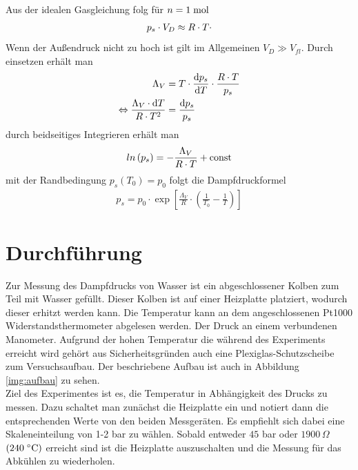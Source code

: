 \documentclass[12pt, a4paper, twoside]{scrartcl}
\begin{document}
Aus der idealen Gasgleichung folg für $n = 1\mathrel{\textnormal{mol}}$
\begin{align}
 p_s\cdot V_D \approx R\cdot T\cdot\nonumber
\end{align}
Wenn der Außendruck nicht zu hoch ist gilt im Allgemeinen $V_D \gg V_{fl}$. Durch einsetzen erhält man 
\begin{align}
 \Lambda_V &= T\cdot \frac{\textnormal{d}p_s}{\textnormal{d}T}\cdot \frac{R\cdot T}{p_s} \nonumber\\
 \mathrel{\Leftrightarrow} \frac{\Lambda_V \cdot \textnormal{d}T}{R\cdot T^2}&= \frac{\textnormal{d}p_s}{p_s} \nonumber
\end{align}
durch beidseitiges Integrieren erhält man
\begin{align}
  ln\left(p_s\right) = -\frac{\Lambda_V}{R\cdot T} + \textnormal{const}
\end{align}
mit der Randbedingung $p_s(T_0) = p_0$ folgt die Dampfdruckformel
\begin{align}
 p_s = p_0 \cdot \exp\left[\frac{\Lambda_V}{R}\cdot \left(\frac{1}{T_0}-\frac{1}{T}\right)\right]
\end{align}


\section{Durchführung}
\label{sec:durchfuehrung}

Zur Messung des Dampfdrucks von Wasser ist ein abgeschlossener Kolben zum Teil mit Wasser gefüllt. Dieser Kolben ist auf einer Heizplatte platziert, wodurch dieser erhitzt werden kann. Die Temperatur kann an dem angeschlossenen Pt1000 Widerstandsthermometer abgelesen werden. Der Druck an einem verbundenen Manometer. Aufgrund der hohen Temperatur die während des Experiments erreicht wird gehört aus Sicherheitsgründen auch eine Plexiglas-Schutzscheibe zum Versuchsaufbau. Der beschriebene Aufbau ist auch in Abbildung \ref{img:aufbau} zu sehen.\\


Ziel des Experimentes ist es, die Temperatur in Abhängigkeit des Drucks zu messen. Dazu schaltet man zunächst die Heizplatte ein und notiert dann die entsprechenden Werte von den beiden Messgeräten. Es empfiehlt sich dabei eine Skaleneinteilung von 1-2 bar zu wählen. Sobald entweder $45$ bar oder $1900\,\Omega$ $(240\mathrel{^{\circ}}\mathrel{\textnormal{C}})$ erreicht sind ist die Heizplatte auszuschalten und die Messung für das Abkühlen zu wiederholen.
\end{document}
